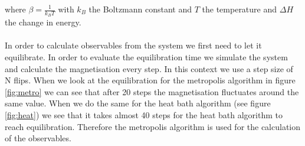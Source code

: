 \documentclass[10 pt, a4paper]{article}
\begin{document}
where $\beta = \frac{1}{k_B T}$ with $k_B$ the Boltzmann constant and $T$ the temperature and $\Delta H$ the change in energy.
\\
\\
In order to calculate observables from the system we first need to let it equilibrate. In order to evaluate the equilibration time we simulate the system and calculate the magnetisation every step. In this context we use a step size of N flips. When we look at the equilibration for the metropolis algorithm in figure \ref{fig:metro} we can see that after 20 steps the magnetisation fluctuates around the same value. When we do the same for the heat bath algorithm (see figure \ref{fig:heat}) we see that it takes almost 40 steps for the heat bath algorithm to reach equilibration. Therefore the metropolis algorithm is used for the calculation of the observables.
\end{document}
